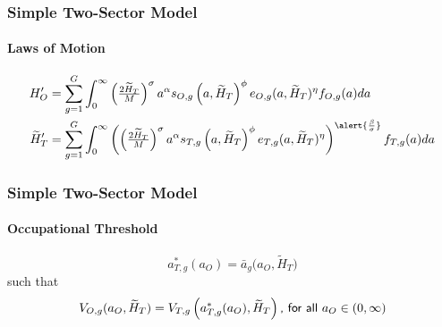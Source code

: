 \documentclass[11pt]{beamer}
\begin{document}
 \begin{frame}
		\frametitle{Simple Two-Sector Model}
		\framesubtitle{Laws of Motion}
		\begin{align*}
			{H}_{O}' & = \sum_{g=1}^G \int_0^\infty \left(\tfrac{2 \widetilde{H}_T}{M}\right)^\sigma a^\alpha s_{O,g}\left(a,\widetilde{H}_T\right)^\phi e_{O,g}(a,\widetilde{H}_T)^\eta  f_{O,g}(a) da \\
			\widetilde{H}_{T}' & = \sum_{g=1}^G \int_0^\infty \left(\left(\tfrac{2 \widetilde{H}_T}{M}\right)^\sigma a^\alpha s_{T,g}\left(a,\widetilde{H}_T\right)^\phi e_{T,g}(a,\widetilde{H}_T)^\eta \right)^{\alert{\frac{\beta}{\sigma}}} f_{T,g}(a) da 
		\end{align*}
	\end{frame}
	
	\begin{frame}
		\frametitle{Simple Two-Sector Model}
		\framesubtitle{Occupational Threshold}
		\begin{equation*}
			a^*_{T,g}(a_O) = \bar{a}_g\big(a_{O},\widetilde{H}_T\big) %
		\end{equation*}
		such that
		\begin{equation}
			\label{eq:indiff}
			V_{O,g}(a_{O},\widetilde{H}_T) = V_{T,g}\left(a^*_{T,g}(a_O),\widetilde{H}_T\right) \textrm{{\sf , for all} } a_O \in (0,\infty) \nonumber
		\end{equation}
	\end{frame}
	
\end{document}
